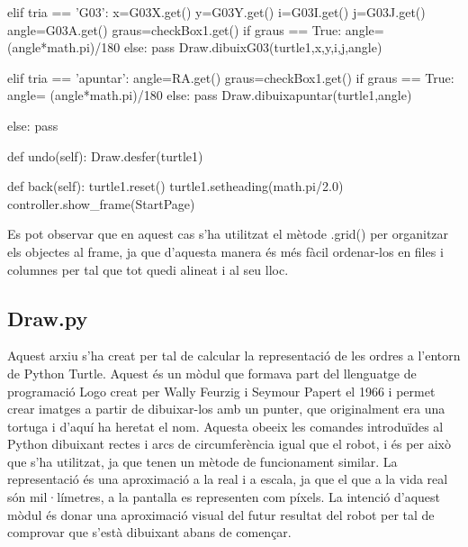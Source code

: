 \begin{python}
				elif tria == 'G03':
					x=G03X.get()
					y=G03Y.get()
					i=G03I.get()
					j=G03J.get()
					angle=G03A.get()
					graus=checkBox1.get()
					if graus == True:
						angle= (angle*math.pi)/180
					else:
						pass
					Draw.dibuixG03(turtle1,x,y,i,j,angle)
				
				elif tria == 'apuntar':
					angle=RA.get()
					graus=checkBox1.get()
					if graus == True:
						angle= (angle*math.pi)/180
					else:
						pass
					Draw.dibuixapuntar(turtle1,angle)
				
				else:
					pass
			
			def undo(self):
				Draw.desfer(turtle1)
			
			
			def back(self):
				turtle1.reset()
				turtle1.setheading(math.pi/2.0)
				controller.show_frame(StartPage)
\end{python}

Es pot observar que en aquest cas s’ha utilitzat el mètode .grid() per organitzar els objectes al frame, ja que d’aquesta manera és més fàcil ordenar-los en files i columnes per tal que tot quedi alineat i al seu lloc.

\subsection{Draw.py} \label{sec:Draw}

Aquest arxiu s’ha creat per tal de calcular la representació de les ordres a l’entorn de Python Turtle. Aquest és un mòdul que formava part del llenguatge de programació Logo creat per Wally Feurzig i Seymour Papert el 1966 i permet crear imatges a partir de dibuixar-los amb un punter, que originalment era una tortuga i d’aquí ha heretat el nom. Aquesta obeeix les comandes introduïdes al Python dibuixant rectes i arcs de circumferència igual que el robot, i és per això que s’ha utilitzat, ja que tenen un mètode de funcionament similar. La representació és una aproximació a la real i a escala, ja que el que a la vida real són mil·límetres, a la pantalla es representen com píxels. La intenció d’aquest mòdul és donar una aproximació visual del futur resultat del robot per tal de comprovar que s’està dibuixant abans de començar. 




  

